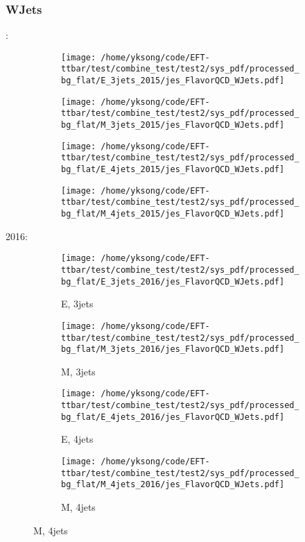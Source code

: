 \documentclass{beamer}
\begin{document}
\begin{frame}
\frametitle{WJets}
\fontsize{5}{1}:
\begin{figure}
\centering
\begin{subfigure}[b]{0.24\textwidth}
\texttt{[image: /home/yksong/code/EFT-ttbar/test/combine\_test/test2/sys\_pdf/processed\_bg\_flat/E\_3jets\_2015/jes\_FlavorQCD\_WJets.pdf]}
\end{subfigure}
\begin{subfigure}[b]{0.24\textwidth}
\texttt{[image: /home/yksong/code/EFT-ttbar/test/combine\_test/test2/sys\_pdf/processed\_bg\_flat/M\_3jets\_2015/jes\_FlavorQCD\_WJets.pdf]}
\end{subfigure}
\begin{subfigure}[b]{0.24\textwidth}
\texttt{[image: /home/yksong/code/EFT-ttbar/test/combine\_test/test2/sys\_pdf/processed\_bg\_flat/E\_4jets\_2015/jes\_FlavorQCD\_WJets.pdf]}
\end{subfigure}
\begin{subfigure}[b]{0.24\textwidth}
\texttt{[image: /home/yksong/code/EFT-ttbar/test/combine\_test/test2/sys\_pdf/processed\_bg\_flat/M\_4jets\_2015/jes\_FlavorQCD\_WJets.pdf]}
\end{subfigure}
\end{figure}
2016:
\begin{figure}
\centering
\begin{subfigure}[b]{0.24\textwidth}
\texttt{[image: /home/yksong/code/EFT-ttbar/test/combine\_test/test2/sys\_pdf/processed\_bg\_flat/E\_3jets\_2016/jes\_FlavorQCD\_WJets.pdf]}
\captionsetup{font=tiny}
\caption{E, 3jets}
\end{subfigure}
\begin{subfigure}[b]{0.24\textwidth}
\texttt{[image: /home/yksong/code/EFT-ttbar/test/combine\_test/test2/sys\_pdf/processed\_bg\_flat/M\_3jets\_2016/jes\_FlavorQCD\_WJets.pdf]}
\captionsetup{font=tiny}
\caption{M, 3jets}
\end{subfigure}
\begin{subfigure}[b]{0.24\textwidth}
\texttt{[image: /home/yksong/code/EFT-ttbar/test/combine\_test/test2/sys\_pdf/processed\_bg\_flat/E\_4jets\_2016/jes\_FlavorQCD\_WJets.pdf]}
\captionsetup{font=tiny}
\caption{E, 4jets}
\end{subfigure}
\begin{subfigure}[b]{0.24\textwidth}
\texttt{[image: /home/yksong/code/EFT-ttbar/test/combine\_test/test2/sys\_pdf/processed\_bg\_flat/M\_4jets\_2016/jes\_FlavorQCD\_WJets.pdf]}
\captionsetup{font=tiny}
\caption{M, 4jets}
\end{subfigure}
\end{figure}
\end{frame}
\end{document}
